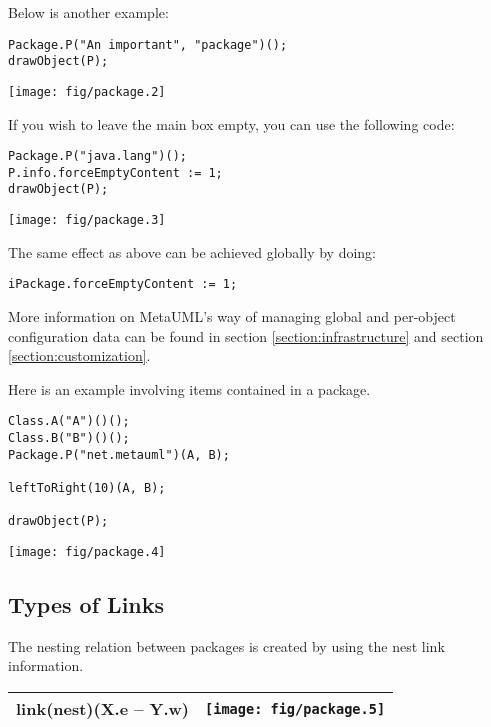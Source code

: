 \documentclass{article}
\newcommand{\code}{\ttfamily}
\begin{document}
Below is another example:

\begin{multicols}{2}
\begin{verbatim}
Package.P("An important", "package")();
drawObject(P);
\end{verbatim}
\columnbreak
\hspace{3cm}\texttt{[image: fig/package.2]}
\end{multicols}

If you wish to leave the main box empty, you can use the following code:

\begin{multicols}{2}
\begin{verbatim}
Package.P("java.lang")();
P.info.forceEmptyContent := 1;
drawObject(P);
\end{verbatim}
\columnbreak
\hspace{3cm}\texttt{[image: fig/package.3]}
\end{multicols}

The same effect as above can be achieved globally by doing:

\begin{verbatim}
iPackage.forceEmptyContent := 1;
\end{verbatim}

More information on MetaUML's way of managing global and per-object configuration data can be found in section \ref{section:infrastructure} and section \ref{section:customization}.

Here is an example involving items contained in a package.

\begin{multicols}{2}
\begin{verbatim}
Class.A("A")()();
Class.B("B")()();
Package.P("net.metauml")(A, B);

leftToRight(10)(A, B);

drawObject(P);
\end{verbatim}
\columnbreak
\hspace{3cm}\texttt{[image: fig/package.4]}
\end{multicols}

\subsection{Types of Links}

The nesting relation between packages is created by using the {\code nest} link information.

\begin{tabular}{||l|c||}
\hline
{\code link(nest)(X.e -- Y.w)} & \texttt{[image: fig/package.5]} \\
\hline
\end{tabular}
\end{document}
